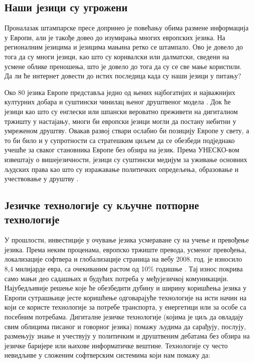 \begin{multicols}{2}
\subsection {Наши језици су угрожени}
  
Проналазак штампарске пресе допринео је повећању обима размене информација у Европи, али је такође довео до изумирања многих европских језика. На регионалним језицима и језицима мањина ретко се штампало. Ово је довело до тога да су многи језици, као што су корнвалски или далматски, сведени на усмене облике преношења, што је довело до тога да су се све мање користили.  Да ли ће интернет довести до истих последица када су наши језици у питању?


Око 80 језика Европе представља једно од њених најбогатијих и најважнијих културних добара и суштински чинилац њеног друштвеног модела  \cite{EC2}. Док ће језици као што су енглески или шпански вероватно преживети на дигиталном тржишту у настајању, многи би европски језици могли да постану небитни у умреженом друштву. Овакав развој ствари ослабио би позицију Европе у свету, а то би било и у супротности са стратешким циљем да се обезбеди подједнако учешће за сваког становника Европе без обзира на језик. Према УНЕСКО-вом извештају о вишејезичности, језици су суштински медијум за уживање основних људских права као што су изражавање политичких опредељења, образовање и учествовање у друштву  \cite{Unesco1}.


\subsection {Језичке технологије су кључне потпорне технологије}
  
У прошлости, инвестиције у очување језика усмераване су на учење и превођење језика. Према неким проценама, европско тржиште превода, усменог превођења, локализације софтвера и глобализације страница на вебу  2008. год. је износило 8,4 милијарде евра, са очекиваним растом од 10\% годишње \cite{EC3}. Тај износ покрива само мањи део садашњих и будућих потреба у међујезичкој комуникацији. Најубедљивије решење које ће обезбедити дубину и ширину коришћења језика у Европи сутрашњице јесте коришћење одговарајуће технологије на исти начин на који се користе технологије за потребе транспорта, у енергетици или за особе са посебним потребама. Дигиталне језичке технологије (којима је циљ да овладају свим облицима писаног и говорног језика) помажу људима да сарађују, послују, размењују знање и учествују у политичким и друштвеним дебатама без обзира на језичке баријере или њихове информатичке вештине. Технологије су често невидљиве у сложеним софтверским системима који нам помажу да:


\end{multicols}
